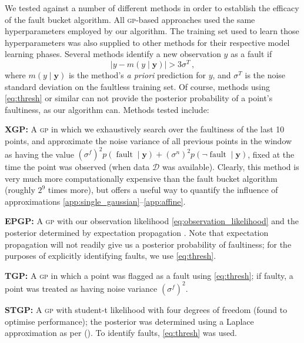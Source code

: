 \documentclass[letterpaper]{article}
\newcommand{\given}{\!\ensuremath{\mid}\!}
\newcommand{\cm}[1]{\ensuremath{\mathcal{#1}}}
\newcommand{\bm}[1]{\ensuremath{\mathbf{#1}}}
\newcommand{\data}{\ensuremath{\cm{D}}}
\newcommand{\acro}[1]{\textsc{\MakeLowercase{#1}}}
\newcommand{\vect}[1]{\bm{#1}}
\newcommand{\vy}{\vect{y}}
\newcommand{\p}[2]{p(#1\given#2)}
\newcommand{\mean}[2]{{m}(#1\given#2)}
\DeclareMathOperator{\fault}{fault}
\newcommand{\citet}[1]{\citeauthor{#1} (\citeyear{#1})}
\begin{document}
We tested against a number of different methods in order to establish the efficacy of the fault bucket algorithm. All \acro{gp}-based approaches used the same hyperparameters employed by our algorithm. The training set used to learn those hyperparameters was also supplied to other methods for their respective model learning phases. Several methods identify a new observation $y$ as a fault if
\begin{equation}\label{eq:thresh}
 \bigl\lvert y-\mean{y}{\vy} \bigr\rvert > 3\sigma^T\,,
\end{equation}
where $\mean{y}{\vy}$ is the method's \emph{a priori} prediction for $y$, and $\sigma^T$ is the noise standard deviation on the faultless training set. Of course, methods using \eqref{eq:thresh} or similar can not provide the posterior probability of a point's faultiness, as our algorithm can. Methods tested include:

{\bf XGP:}
A  \acro{gp} in which we exhaustively search over the faultiness of the last 10 points, and approximate the noise variance of all previous points in the window as having the value $(\sigma^f)^2 \p{\fault}{\vy} + (\sigma^n)^2 \p{\neg\fault}{\vy}$, fixed at the time the point was observed (when data $\data$ was available). Clearly, this method is very much more computationally expensive than the fault bucket algorithm (roughly $2^9$ times more), but offers a useful way to quantify the influence of approximations \ref{app:single_gaussian}--\ref{app:affine}.

{\bf EPGP:}
A \acro{gp} with our observation likelihood \eqref{eq:observation_likelihood} and the posterior determined by expectation propagation \cite{minka2001expectation}. Note that expectation propagation will not readily give us a posterior probability of faultiness; for the purposes of explicitly identifying faults, we use \eqref{eq:thresh}.

{\bf TGP:}
A \acro{gp} in which a point was flagged as a fault using \eqref{eq:thresh}; if faulty, a point was treated as having noise variance $(\sigma^f)^2$.

{\bf STGP:}
A \acro{gp} with student-t likelihood with four degrees of freedom (found to optimise performance); the posterior was determined using a Laplace approximation as per \citet{vanhatalo2009gaussian}. To identify faults, \eqref{eq:thresh} was used.
\end{document}
